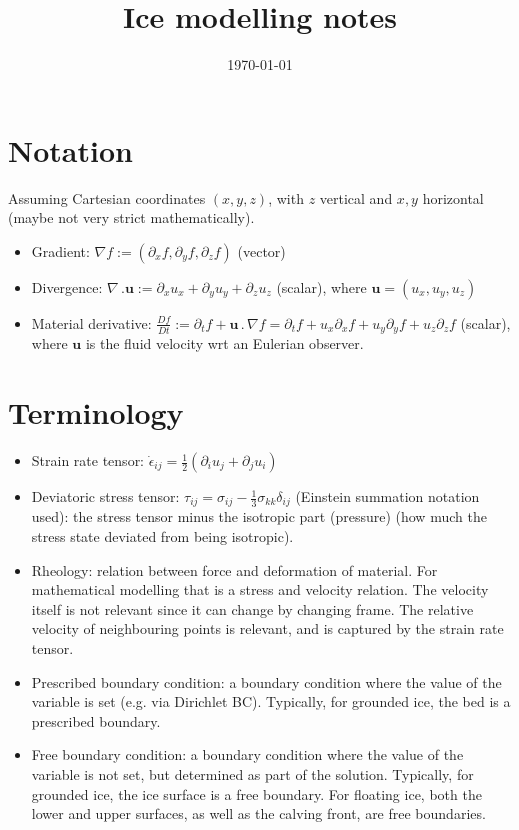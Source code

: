\documentclass[11pt,a4paper]{article}
\title{Ice modelling notes}
\author{}
\date{\today}
\newcommand{\p}{\partial}
\begin{document}
\maketitle

\tableofcontents

\section{Notation}

Assuming Cartesian coordinates $(x,y,z)$, with $z$ vertical and $x,y$ horizontal (maybe not very strict mathematically).
\begin{itemize}
    \item Gradient: $\nabla f:= (\p_x f, \p_y f, \p_z f)$ (vector)
    \item Divergence: $ \nabla \, . \mathbf{u} := \p_x u_x + \p_y u_y + \p_z u_z$ (scalar), where $\mathbf{u} = (u_x, u_y, u_z)$
    \item Material derivative: $\frac{D f}{D t} := \p_t f + \mathbf{u} \, . \, \nabla f = \p_t f + u_x \p_x f + u_y \p_y f  + u_z \p_z f$ (scalar), where $\mathbf{u}$ is the fluid velocity wrt an Eulerian observer. 
\end{itemize}

\section{Terminology}

\begin{itemize}
    \item Strain rate tensor: $\dot{\epsilon}_{ij} = \frac{1}{2} \left( \p_i u_j + \p_j u_i \right)$
    \item Deviatoric stress tensor: $\tau_{ij} = \sigma_{ij} - \frac{1}{3} \sigma_{kk} \delta_{ij}$ (Einstein summation notation used): the stress tensor minus the isotropic part (pressure) (how much the stress state deviated from being isotropic). 
    \item Rheology: relation between force and deformation of material. For mathematical modelling that is a stress and velocity relation. The velocity itself is not relevant since it can change by changing frame. The relative velocity of neighbouring points is relevant, and is captured by the strain rate tensor.
    \item Prescribed boundary condition: a boundary condition where the value of the variable is set (e.g. via Dirichlet BC). Typically, for grounded ice, the bed is a prescribed boundary.
    \item Free boundary condition: a boundary condition where the value of the variable is not set, but determined as part of the solution. Typically, for grounded ice, the ice surface is a free boundary. For floating ice, both the lower and upper surfaces, as well as the calving front, are free boundaries.
\end{itemize}
\end{document}
